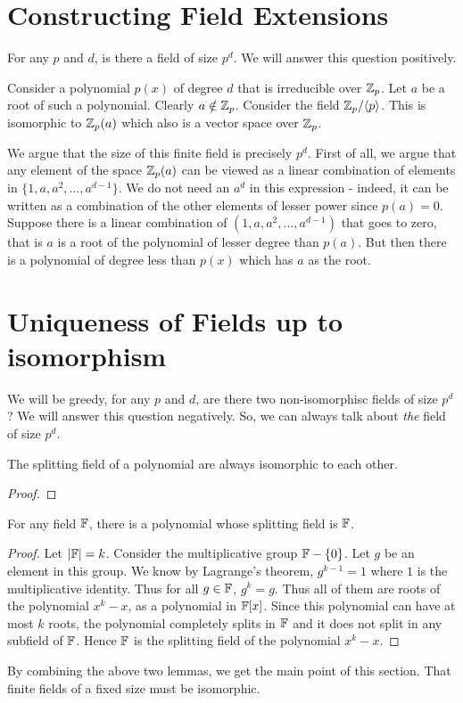 \section{Constructing Field Extensions}

For any $p$ and $d$, is there a field of size $p^d$. We will answer this question positively.

Consider a polynomial $p(x)$ of degree $d$ that is irreducible over ${\mathbb{Z}}_p$. Let $a$ be a root of such a polynomial. Clearly $a \notin {\mathbb{Z}}_p$. Consider the field ${\mathbb{Z}}_p/\langle p \rangle$. This is isomorphic to ${\mathbb{Z}}_p(a)$ which also is a vector space over ${\mathbb{Z}}_p$. 

We argue that the size of this finite field is precisely $p^d$. First of all, we argue that any element of the space ${\mathbb{Z}}_p(a)$ can be viewed as a linear combination of elements in $\{1, a, a^2, \ldots, a^{d-1}\}$. We do not need an $a^d$ in this expression - indeed, it can be written as a combination of the other elements of lesser power since $p(a) = 0$. Suppose there is a linear combination of $(1, a, a^2, \ldots, a^{d-1})$ that goes to zero, that is $a$ is a root of the polynomial of lesser degree than $p(a)$. But then there is a polynomial of degree less than $p(x)$ which has $a$ as the root.

\section{Uniqueness of Fields up to isomorphism}

We will be greedy, for any $p$ and $d$, are there two non-isomorphisc fields of size $p^d$? We will answer this question negatively. So, we can always talk about {\em the} field of size $p^d$.
\begin{lemma}
The splitting field of a polynomial are always isomorphic to each other.
\end{lemma}
\begin{proof}
\end{proof}

\begin{lemma}
For any field ${\mathbb{F}}$, there is a polynomial whose splitting field is ${\mathbb{F}}$.
\end{lemma}
\begin{proof}
Let $|{\mathbb{F}}| = k$. Consider the multiplicative group ${\mathbb{F}} - \{0\}$. Let $g$ be an element in  this group. We know by Lagrange's theorem, $g^{k-1} = 1$ where $1$ is the multiplicative identity. Thus for all $g \in {\mathbb{F}}$, $g^k = g$. Thus all of them are roots of the polynomial $x^k - x$, as a polynomial in ${\mathbb{F}}[x]$. Since this polynomial can have at most $k$ roots, the polynomial completely splits in ${\mathbb{F}}$ and it does not split in any subfield of ${\mathbb{F}}$. Hence ${\mathbb{F}}$ is the splitting field of the polynomial $x^k - x$. 
\end{proof}

By combining the above two lemmas, we get the main point of this section. That finite fields of a fixed size must be isomorphic.